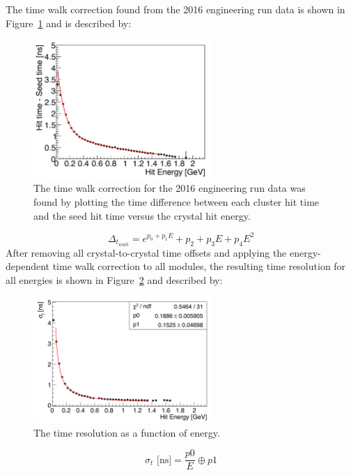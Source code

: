 The time walk correction found from the 2016 engineering run data is shown in Figure~\ref{Figure:twalk} and is described by:
\begin{figure}[htb]
  \centering
      \includegraphics[width=0.6\textwidth]{pics/performance/twalk2016.png}
  \caption[Time walk correction for the 2016 engineering run ECal data]{The time walk correction for the 2016 engineering run data was found by plotting the time difference between each cluster hit time and the seed hit time versus the crystal hit energy.}
  \label{Figure:twalk}
\end{figure}
\begin{equation}
	\label{eq:twalkEq}
		\Delta_{t_{walk}} = e^{p_0+p_1E}+p_2+p_3E+p_4E^2	
\end{equation}
After removing all crystal-to-crystal time offsets and applying the energy-dependent time walk correction to all modules, the resulting time resolution for all energies is shown in Figure~\ref{Figure:timeRes} and described by:
\begin{figure}[htb]
  \centering
      \includegraphics[width=0.6\textwidth]{pics/performance/timeRes2016.png}
  \caption[Time resolution of the ECal for the 2016 run ]{The time resolution as a function of energy.}
  \label{Figure:timeRes}
\end{figure}
\begin{equation}
	\label{eq:twalkEqn}
		\sigma_t \textrm{ [ns]} = \dfrac{p0}{E}\oplus p1	
\end{equation}

